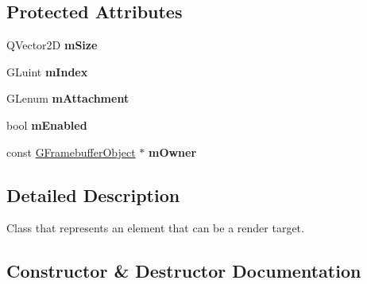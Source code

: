 \subsection*{Protected Attributes}
\begin{DoxyCompactItemize}
\item 
\mbox{\label{class_geometry_engine_1_1_geometry_buffer_1_1_g_render_target_a3e527ce7cba2030bb6ff08be940a8dca}} 
Q\+Vector2D {\bfseries m\+Size}
\item 
\mbox{\label{class_geometry_engine_1_1_geometry_buffer_1_1_g_render_target_ad032baa2138e00d64388256216b8bc19}} 
G\+Luint {\bfseries m\+Index}
\item 
\mbox{\label{class_geometry_engine_1_1_geometry_buffer_1_1_g_render_target_a15b9222245c7190f4cc508a97d02e883}} 
G\+Lenum {\bfseries m\+Attachment}
\item 
\mbox{\label{class_geometry_engine_1_1_geometry_buffer_1_1_g_render_target_a76b2628206e3d0db7a2620636a6ac83d}} 
bool {\bfseries m\+Enabled}
\item 
\mbox{\label{class_geometry_engine_1_1_geometry_buffer_1_1_g_render_target_a7af62bab8ae5c64bef93716490c3bbf4}} 
const \mbox{\hyperlink{class_geometry_engine_1_1_geometry_buffer_1_1_g_framebuffer_object}{G\+Framebuffer\+Object}} $\ast$ {\bfseries m\+Owner}
\end{DoxyCompactItemize}


\subsection{Detailed Description}
Class that represents an element that can be a render target. 

\subsection{Constructor \& Destructor Documentation}
\mbox{\label{class_geometry_engine_1_1_geometry_buffer_1_1_g_render_target_a8f9dc8c82ec5f21b7386e30073bed483}} 
